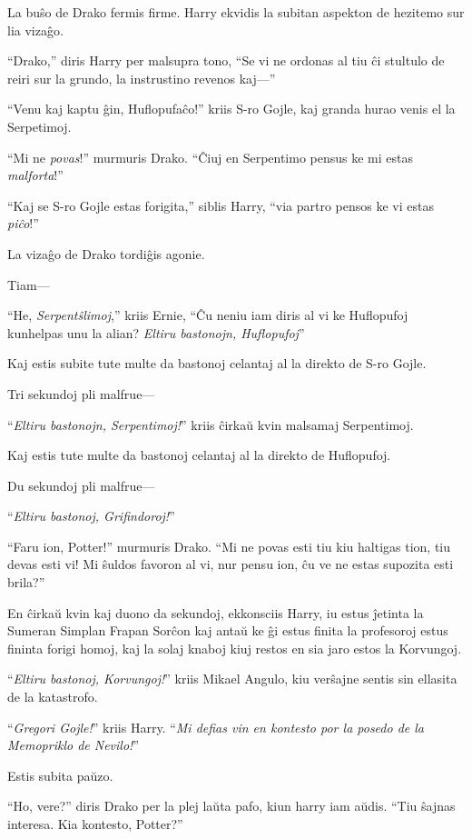 La buŝo de Drako fermis firme. Harry ekvidis la subitan aspekton de hezitemo sur lia vizaĝo.

``Drako,'' diris Harry per malsupra tono, ``Se vi ne ordonas al tiu ĉi
stultulo de reiri sur la grundo, la instrustino revenos kaj—''

``Venu kaj kaptu ĝin, Huflopufaĉo!'' kriis S-ro Gojle, kaj granda hurao venis el la Serpetimoj.

``Mi ne \emph{povas}!'' murmuris Drako. ``Ĉiuj en Serpentimo pensus ke
mi estas \emph{malforta}!''

``Kaj se S-ro Gojle estas forigita,'' siblis Harry, ``via partro
pensos ke vi estas \emph{piĉo}!''

La vizaĝo de Drako tordiĝis agonie.

Tiam—

``He, \emph{Serpentŝlimoj},'' kriis Ernie, ``Ĉu neniu iam diris al vi ke
Huflopufoj kunhelpas unu la alian? \emph{Eltiru bastonojn,
  Huflopufoj}''

Kaj estis subite tute multe da bastonoj celantaj al la direkto de S-ro
Gojle.

Tri sekundoj pli malfrue—

``\emph{Eltiru bastonojn, Serpentimoj!}'' kriis ĉirkaŭ kvin malsamaj Serpentimoj.

Kaj estis tute multe da bastonoj celantaj al la direkto de Huflopufoj.

Du sekundoj pli malfrue—

``\emph{Eltiru bastonoj, Grifindoroj!}''

``Faru ion, Potter!'' murmuris Drako. ``Mi ne povas esti tiu kiu
haltigas tion, tiu devas esti vi! Mi ŝuldos favoron al vi, nur pensu
ion, ĉu ve ne estas supozita esti brila?''

En ĉirkaŭ kvin kaj duono da sekundoj, ekkonsciis Harry, iu estus
ĵetinta la Sumeran Simplan Frapan Sorĉon kaj antaŭ ke ĝi estus finita
la profesoroj estus fininta forigi homoj, kaj la solaj knaboj kiuj
restos en sia jaro estos la Korvungoj.

``\emph{Eltiru bastonoj, Korvungoj!}'' kriis Mikael Angulo, kiu
verŝajne sentis sin ellasita de la katastrofo.

``\emph{Gregori Gojle!}'' kriis Harry. ``\emph{Mi defias vin en
kontesto por la posedo de la Memopriklo de Nevilo!}''


Estis subita paŭzo.

``Ho, vere?'' diris Drako per la plej laŭta pafo, kiun harry iam
aŭdis. ``Tiu ŝajnas interesa. Kia kontesto, Potter?''

